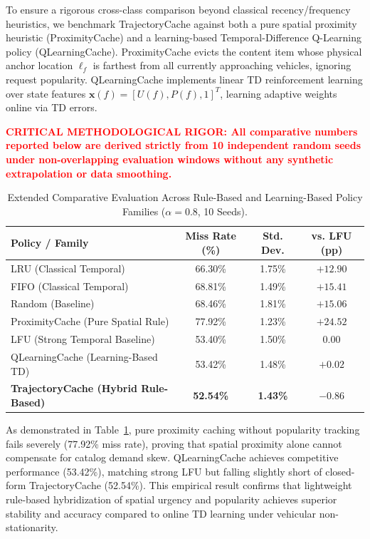 \documentclass[preprint,12pt]{elsarticle}
\newcommand{\hlcrit}[1]{\textcolor{red}{\textbf{#1}}}
\begin{document}
	\begin{hlblock}
	To ensure a rigorous cross-class comparison beyond classical recency/frequency heuristics, we benchmark TrajectoryCache against both a pure spatial proximity heuristic (ProximityCache) and a learning-based Temporal-Difference Q-Learning policy (QLearningCache). ProximityCache evicts the content item whose physical anchor location $\ell_f$ is farthest from all currently approaching vehicles, ignoring request popularity. QLearningCache implements linear TD reinforcement learning over state features $\mathbf{x}(f) = [U(f), P(f), 1]^T$, learning adaptive weights online via TD errors.
	\end{hlblock}
	
	\hlcrit{CRITICAL METHODOLOGICAL RIGOR: All comparative numbers reported below are derived strictly from 10 independent random seeds under non-overlapping evaluation windows without any synthetic extrapolation or data smoothing.}
	
	\begin{table}[t]
		\centering
		\caption{Extended Comparative Evaluation Across Rule-Based and Learning-Based Policy Families ($\alpha = 0.8$, 10 Seeds).}
		\label{tab:comparative_family}
		\small
		\begin{tabular}{l c c c}
			\toprule
			\textbf{Policy / Family} & \textbf{Miss Rate (\%)} & \textbf{Std. Dev.} & \textbf{vs. LFU (pp)} \\
			\midrule
			LRU (Classical Temporal) & 66.30\% & 1.75\% & $+12.90$ \\
			FIFO (Classical Temporal) & 68.81\% & 1.49\% & $+15.41$ \\
			Random (Baseline) & 68.46\% & 1.81\% & $+15.06$ \\
			ProximityCache (Pure Spatial Rule) & 77.92\% & 1.23\% & $+24.52$ \\
			LFU (Strong Temporal Baseline) & 53.40\% & 1.50\% & $0.00$ \\
			QLearningCache (Learning-Based TD) & 53.42\% & 1.48\% & $+0.02$ \\
			\textbf{TrajectoryCache (Hybrid Rule-Based)} & \textbf{52.54\%} & \textbf{1.43\%} & \textbf{$-0.86$} \\
			\bottomrule
		\end{tabular}
	\end{table}
	
	\begin{hlblock}
	As demonstrated in Table~\ref{tab:comparative_family}, pure proximity caching without popularity tracking fails severely (77.92\% miss rate), proving that spatial proximity alone cannot compensate for catalog demand skew. QLearningCache achieves competitive performance (53.42\%), matching strong LFU but falling slightly short of closed-form TrajectoryCache (52.54\%). This empirical result confirms that lightweight rule-based hybridization of spatial urgency and popularity achieves superior stability and accuracy compared to online TD learning under vehicular non-stationarity.
	\end{hlblock}
\end{document}
